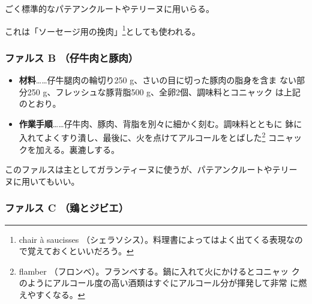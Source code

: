 \begin{recette}
ごく標準的なパテアンクルートやテリーヌに用いらる。

これは「\protect\hypertarget{chair-a-saucisse}{ソーセージ用の挽肉}」\footnote{chair
  à saucisses
  （シェラソシス）。料理書によってはよく出てくる表現なので覚えておくといいだろう。}としても使われる。\label{chair-a-saucisse}

\maeaki

\hypertarget{farce-froide-b}{%
\subsubsection{ファルス B （仔牛肉と豚肉）}\label{farce-froide-b}}



\begin{itemize}
\item
  \textbf{材料}\ldots{}\ldots{}仔牛腿肉の輪切り250
  g、さいの目に切った豚肉の脂身を含ま ない部分250
  g、フレッシュな豚背脂500 g、全卵2個、調味料とコニャック
  は上記のとおり。
\item
  \textbf{作業手順}\ldots{}\ldots{}仔牛肉、豚肉、背脂を別々に細かく刻む。調味料とともに
  鉢に入れてよくすり潰し、最後に、火を点けてアルコールをとばした\footnote{flamber
    （フロンベ）。フランベする。鍋に入れて火にかけるとコニャッ
    クのようにアルコール度の高い酒類はすぐにアルコール分が揮発して非常
    に燃えやすくなる。} コニャックを加える。裏漉しする。
\end{itemize}

このファルスは主としてガランティーヌに使うが、パテアンクルートやテリー
ヌに用いてもいい。

\hypertarget{farce-froide-c}{%
\subsubsection{ファルス C （鶏とジビエ）}\label{farce-froide-c}}




\end{recette}
